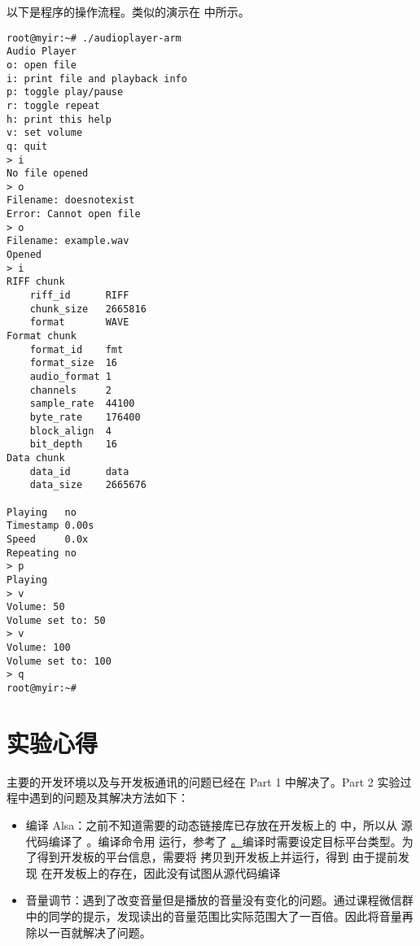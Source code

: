 以下是程序的操作流程。类似的演示在  中所示。

\begin{multicols}{2}
\begin{verbatim}
root@myir:~# ./audioplayer-arm
Audio Player
o: open file
i: print file and playback info
p: toggle play/pause
r: toggle repeat
h: print this help
v: set volume
q: quit
> i
No file opened
> o
Filename: doesnotexist
Error: Cannot open file
> o
Filename: example.wav
Opened
> i
RIFF chunk
    riff_id      RIFF
    chunk_size   2665816
    format       WAVE
Format chunk
    format_id    fmt
    format_size  16
    audio_format 1
    channels     2
    sample_rate  44100
    byte_rate    176400
    block_align  4
    bit_depth    16
Data chunk
    data_id      data
    data_size    2665676

Playing   no
Timestamp 0.00s
Speed     0.0x
Repeating no
> p
Playing
> v
Volume: 50
Volume set to: 50
> v
Volume: 100
Volume set to: 100
> q
root@myir:~#
\end{verbatim}
\end{multicols}

\newpage

\section{实验心得}

主要的开发环境以及与开发板通讯的问题已经在 Part 1 中解决了。Part 2 实验过程中遇到的问题及其解决方法如下：

\begin{itemize}
    \item 编译 Alsa：之前不知道需要的动态链接库已存放在开发板上的  中，所以从  源代码编译了 。编译命令用  运行，参考了 \href{https://github.com/michaelwu/alsa-lib/blob/master/INSTALL}。编译时需要设定目标平台类型。为了得到开发板的平台信息，需要将  拷贝到开发板上并运行，得到 
    由于提前发现  在开发板上的存在，因此没有试图从源代码编译 
    \item 音量调节：遇到了改变音量但是播放的音量没有变化的问题。通过课程微信群中的同学的提示，发现读出的音量范围比实际范围大了一百倍。因此将音量再除以一百就解决了问题。
\end{itemize}
